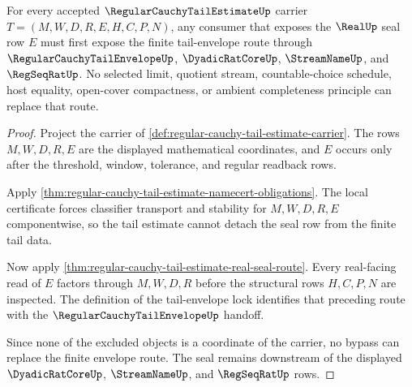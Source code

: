 \begin{theorem}
\label{thm:regular-cauchy-tail-estimate-tail-envelope-lock}
For every accepted $\RegularCauchyTailEstimateUp$ carrier
$T=(M,W,D,R,E,H,C,P,N)$, any consumer that exposes the $\RealUp$ seal row $E$
must first expose the finite tail-envelope route through
$\RegularCauchyTailEnvelopeUp$, $\DyadicRatCoreUp$, $\StreamNameUp$, and
$\RegSeqRatUp$. No selected limit, quotient stream, countable-choice schedule,
host equality, open-cover compactness, or ambient completeness principle can
replace that route.
\end{theorem}
\begin{proof}
Project the carrier of
\autoref{def:regular-cauchy-tail-estimate-carrier}. The rows $M,W,D,R,E$ are
the displayed mathematical coordinates, and $E$ occurs only after the
threshold, window, tolerance, and regular readback rows.

Apply \autoref{thm:regular-cauchy-tail-estimate-namecert-obligations}. The
local certificate forces classifier transport and stability for $M,W,D,R,E$
componentwise, so the tail estimate cannot detach the seal row from the finite
tail data.

Now apply \autoref{thm:regular-cauchy-tail-estimate-real-seal-route}. Every
real-facing read of $E$ factors through $M,W,D,R$ before the structural rows
$H,C,P,N$ are inspected. The definition of the tail-envelope lock identifies
that preceding route with the $\RegularCauchyTailEnvelopeUp$ handoff.

Since none of the excluded objects is a coordinate of the carrier, no bypass
can replace the finite envelope route. The seal remains downstream of the
displayed $\DyadicRatCoreUp$, $\StreamNameUp$, and $\RegSeqRatUp$ rows.
\end{proof}

